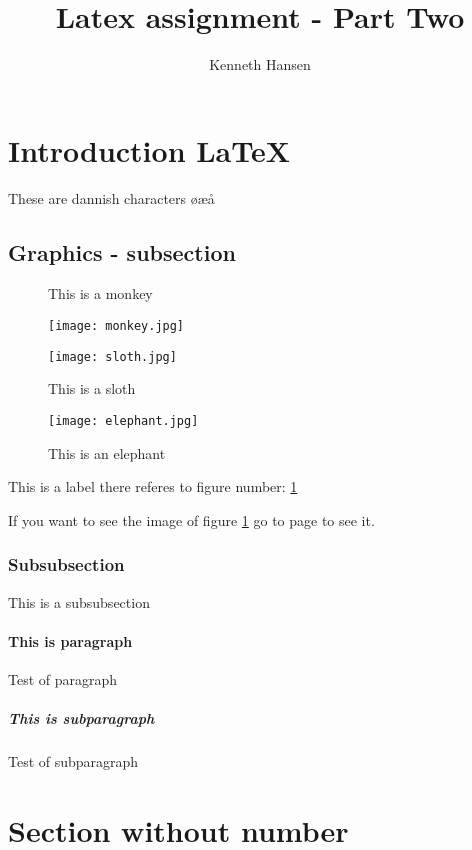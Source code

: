 \documentclass{article}
\author{Kenneth Hansen}
\title{Latex assignment - Part Two}
\begin{document}
\maketitle
\thispagestyle{empty}
\tableofcontents

\clearpage 
\section{Introduction \LaTeX}
These are dannish characters øæå

\subsection{Graphics - subsection}

\begin{figure}[!h]
  \centering
  \begin{minipage}[b]{0.4\textwidth}
    \caption{This is a monkey}
    \texttt{[image: monkey.jpg]}
  \end{minipage}
  \hfill
  \begin{minipage}[b]{0.4\textwidth}
    \caption{This is a sloth}
    \texttt{[image: sloth.jpg]}
  \end{minipage}
\end{figure}

\begin{figure}[!h]
  \centering
    \texttt{[image: elephant.jpg]}
    \caption{This is an elephant}
    \label{fig:elephant}
\end{figure}

This is a label there referes to figure number: \ref{fig:elephant} 

If you want to see the image of figure \ref{fig:elephant} go to page \pageref{fig:elephant} to see it.

\subsubsection{Subsubsection}
This is a subsubsection

\paragraph{This is  paragraph}
Test of paragraph
\subparagraph{This is subparagraph}
Test of subparagraph

\section*{Section without number}
\end{document}
